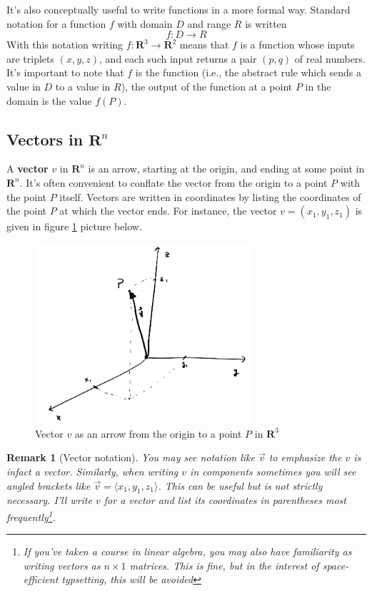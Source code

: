 \documentclass[12pt]{article}
\numberwithin{equation}{subsection}
\numberwithin{figure}{subsection}
\theoremstyle{note}
\newtheorem{remark}[subsection]{Remark}
\begin{document}
{It's also conceptually useful to write functions in a more formal way. Standard notation for a function $f$ with domain $D$ and range $R$ is written \begin{equation} f\colon D\to R\end{equation} With this notation writing $f\colon \mathbf{R}^3\to\mathbf{R}^2$ means that $f$ is a function whose inputs are triplets $(x,y,z)$, and each such input returns a pair $(p,q)$ of real numbers. It's important to note that $f$ is the function (i.e., the abstract rule which sends a value in $D$ to a value in $R$), the output of the function at a point $P$ in the domain is the value $f(P)$.

\subsection{Vectors in $\mathbf{R}^n$}

A \textbf{vector} $v$ in $\mathbf{R}^n$ is an arrow, starting at the origin, and ending at some point in $\mathbf{R}^n$. It's often convenient to conflate the vector from the origin to a point $P$ with the point $P$ itself. Vectors are written in coordinates by listing the coordinates of the point $P$ at which the vector ends. For instance, the vector $v=(x_1,y_1,z_1)$ is given in figure \ref{fig-vect-P} picture below. 

\begin{figure}[h!] \centering
 \includegraphics[width=80mm]{Images/vector-P}
 \caption{Vector $v$ as an arrow from the origin to a point $P$ in $\mathbf{R}^3$}
 \label{fig-vect-P}
 \end{figure}

\begin{remark}[Vector notation] You may see notation like $\vec{v}$ to emphasize the $v$ is infact a vector. Similarly, when writing $v$ in components sometimes you will see angled brackets like $\vec{v}=\langle x_1,y_1,z_1\rangle$. This can be useful but is not strictly necessary. I'll write $v$ for a vector and list its coordinates in parentheses most frequently\footnote{If you've taken a course in linear algebra, you may also have familiarity as writing vectors as $n\times 1$ matrices. This is fine, but in the interest of space-efficient typsetting, this will be avoided}. 
\end{remark}

}
\end{document}
